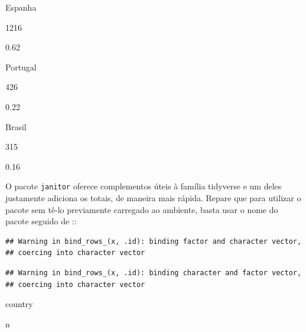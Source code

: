 \documentclass[
]{book}
\newenvironment{Shaded}{\begin{snugshade}}{\end{snugshade}}
\newcommand{\ControlFlowTok}[1]{\textcolor[rgb]{0.13,0.29,0.53}{\textbf{#1}}}
\newcommand{\DataTypeTok}[1]{\textcolor[rgb]{0.13,0.29,0.53}{#1}}
\newcommand{\DecValTok}[1]{\textcolor[rgb]{0.00,0.00,0.81}{#1}}
\newcommand{\KeywordTok}[1]{\textcolor[rgb]{0.13,0.29,0.53}{\textbf{#1}}}
\newcommand{\NormalTok}[1]{#1}
\newcommand{\OperatorTok}[1]{\textcolor[rgb]{0.81,0.36,0.00}{\textbf{#1}}}
\newcommand{\StringTok}[1]{\textcolor[rgb]{0.31,0.60,0.02}{#1}}
\begin{document}
Espanha

1216

0.62

Portugal

426

0.22

Brasil

315

0.16

O pacote \texttt{janitor} oferece complementos úteis à família tidyverse e um deles justamente adiciona os totais, de maneira mais rápida. Repare que para utilizar o pacote sem tê-lo previamente carregado ao ambiente, basta usar o nome do pacote seguido de ::

\begin{Shaded}
\end{Shaded}

\begin{verbatim}
## Warning in bind_rows_(x, .id): binding factor and character vector,
## coercing into character vector
\end{verbatim}

\begin{verbatim}
## Warning in bind_rows_(x, .id): binding character and factor vector,
## coercing into character vector
\end{verbatim}

country

n
\end{document}
